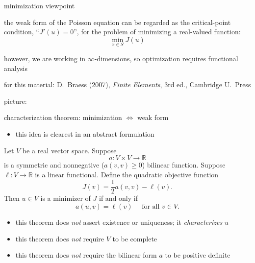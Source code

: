 \documentclass[10pt,
               svgnames,
               hyperref={colorlinks,
                         citecolor=DeepPink4,
                         linkcolor=FireBrick,
                         urlcolor=blue},
               usepdftitle=false]{beamer}
\newcommand{\RR}{\mathbb{R}}
\begin{document}
\begin{frame}{minimization viewpoint}

\begin{itemize}
\item the weak form of the Poisson equation can be regarded as the critical-point condition, ``$J'(u)=0$'', for the problem of minimizing a real-valued function:
	$$\min_{x\in S} J(u)$$
\item however, we are working in $\infty$-dimensions, so optimization requires functional analysis
{\footnotesize
\item for this material: D.~Braess (2007), \emph{Finite Elements}, 3rd ed., Cambridge U.~Press
}
\end{itemize}

\medskip
picture:

\vspace{40mm}
\end{frame}


\begin{frame}{characterization theorem: minimization $\iff$ weak form}

\begin{itemize}
\item this idea is clearest in an abstract formulation
\end{itemize}

\begin{theorem}
Let $V$ be a real vector space.  Suppose
    $$a:V\times V\to \RR$$
is a symmetric and nonnegative ($a(v,v)\ge 0$) bilinear function.  Suppose $\ell:V\to\RR$ is a linear functional.  Define the quadratic objective function
	$$J(v) = \frac{1}{2} a(v,v) - \ell(v).$$
Then $u\in V$ is a minimizer of $J$ if and only if
	$$a(u,v) = \ell(v) \quad \text{ for all } v\in V.$$
\end{theorem}

\begin{itemize}
\item this theorem does \emph{not} assert existence or uniqueness; it \emph{characterizes} $u$
\item this theorem does \emph{not} require $V$ to be complete
\item this theorem does \emph{not} require the bilinear form $a$ to be positive definite
\end{itemize}
\end{frame}
\end{document}
